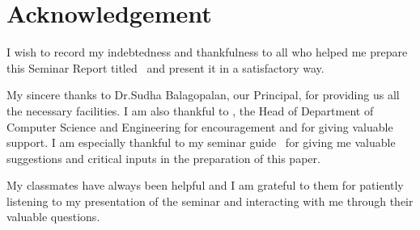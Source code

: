 %
\chapter*{Acknowledgement}
%
I wish to record my indebtedness and thankfulness 
to all who helped me prepare this Seminar Report titled 
\vtitle\  and present it in a satisfactory way. 

My sincere thanks to Dr.Sudha Balagopalan, our Principal, for providing us all the necessary facilities.
I am also thankful to \vhod, 
the Head of Department of Computer Science and Engineering 
for encouragement and for giving valuable 
support.
I am especially thankful to my seminar 
guide \vguide\  
for giving me valuable suggestions and 
critical inputs in the preparation of this paper. 

My classmates have always been 
helpful and I am grateful to them for 
patiently listening to  my presentation of the seminar and interacting with me through their valuable questions. 

